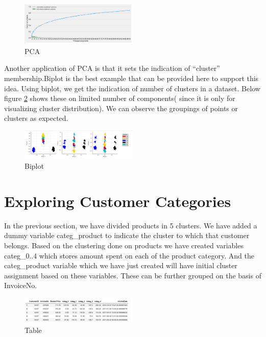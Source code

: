 \begin{figure}[h]
\caption{PCA}
\label{3.5}
\centering
\includegraphics[width=0.5\textwidth]{images/3_5.PNG}
\end{figure}

Another application of PCA is that it sets the indication of “cluster” membership.Biplot is the best example that can be provided here to support this idea. Using biplot, we get the indication of number of clusters in a dataset. Below figure \ref{3.6} shows these on limited number of components( since it is only for visualizing cluster distribution). We can observe the groupings of points or clusters as expected.\\

\begin{figure}[h]
\caption{Biplot}
\label{3.6}
\centering
\includegraphics[width=0.5\textwidth]{images/3_6.PNG}
\end{figure}

\section{Exploring Customer Categories}


In the previous section, we have divided products in 5 clusters. We have added a dummy variable categ\_product to indicate the cluster to which that customer belongs. Based on the clustering done on products we have created variables categ\_0..4 which stores amount spent on each of the product category. And the categ\_product variable which we have just created will have initial cluster assignment based on these variables. These can be further grouped on the basis of InvoiceNo.\\

\begin{figure}[h]
\caption{Table}
\label{4.1}
\centering
\includegraphics[width=0.5\textwidth]{images/4_1.PNG}
\end{figure}


